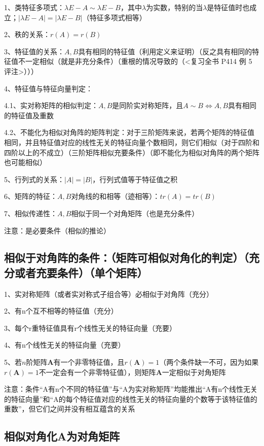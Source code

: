 1、类特征多项式：$\lambda E-A\sim \lambda E-B$，其中$\lambda$为实数，特别的当$\lambda$是特征值时也成立；$|\lambda E-A|=|\lambda E-B|$（特征多项式相等）

2、秩的关系：$r(A)=r(B)$

3、特征值的关系：$A,B$具有相同的特征值（利用定义来证明）（反之具有相同的特征值不一定相似（就是非充分条件）（重根的情况导致的（<复习全书 P414 例 5 评注>）））

4、特征值与特征向量判定：

4.1、实对称矩阵的相似判定：$A,B$是同阶实对称矩阵，且$A \sim B \Leftrightarrow A,B$具有相同的特征值及重数 

4.2、不能化为相似对角阵的矩阵判定：对于三阶矩阵来说，若两个矩阵的特征值相同，并且特征值对应的线性无关的特征向量个数相同，则它们相似（对于四阶和四阶以上的不成立）（三阶矩阵相似充要条件）（即不能化为相似对角阵的两个矩阵也可能相似）

5、行列式的关系：$|A|=|B|$，行列式值等于特征值之积

6、矩阵的特征：$A,B$对角线的和相等（迹相等）：$tr(A)=tr(B)$

7、相似传递性：$A,B$相似于同一个对角矩阵（也是充分条件）

注意：是必要条件（相似的推论）



\subsection{相似于对角阵的条件：（矩阵可相似对角化的判定）（充分或者充要条件）（单个矩阵）}

1、实对称矩阵（或者实对称式子组合等）必相似于对角阵（充分）

2、有n个互不相等的特征值（充分）

3、每个r重特征值具有r个线性无关的特征向量（充要）

4、有n个线性无关的特征向量（充要）

5、若$n$阶矩阵$\boldsymbol{A}$有一个非零特征值，且$r(\boldsymbol{A})=1$（两个条件缺一不可，因为如果$r(\boldsymbol{A})=1$不一定会有一个非零特征值），则矩阵$\boldsymbol{A}$一定相似于对角矩阵

注意：条件“A有n个不同的特征值”与“A为实对称矩阵”均能推出“A有n个线性无关的特征向量”和“A的每个特征值对应的线性无关的特征向量的个数等于该特征值的重数”，但它们之间并没有相互蕴含的关系



\subsection{相似对角化A为对角矩阵}

